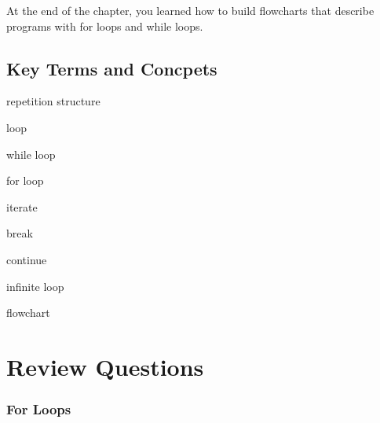 \documentclass{book}
\newenvironment{key_terms}{\begin{multicols}{3}}{\end{multicols}} %
\begin{document}
At the end of the chapter, you learned how to build flowcharts that
describe programs with for loops and while loops.
    




    
        \hypertarget{key-terms-and-concpets}{%
\subsection{Key Terms and Concpets}\label{key-terms-and-concpets}}
    




    
        \begin{key_terms}
        repetition structure

loop

while loop

for loop

iterate

break

continue

infinite loop

flowchart
        \end{key_terms}

    




    
        \hypertarget{review-questions}{%
\section{Review Questions}\label{review-questions}}
    




    
        \hypertarget{for-loops}{%
\subsubsection{For Loops}\label{for-loops}}
    
\end{document}
